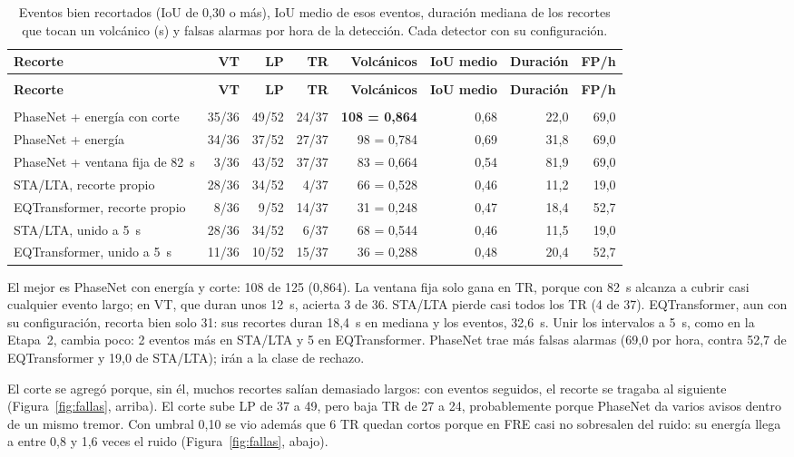 \documentclass[11pt,a4paper,oneside,spanish,oldfontcommands]{memoir}
\newcommand{\cabecera}[2]{%
  \toprule #1 \\ \midrule \endfirsthead
  \multicolumn{#2}{l}{\itshape Cuadro \thetable{} (continuación)}\\
  \toprule #1 \\ \midrule \endhead
  \midrule \multicolumn{#2}{r}{\itshape Continúa en la página siguiente}\\ \endfoot
  \bottomrule \endlastfoot}
\begin{document}
{\small
\setlength{\tabcolsep}{4pt}
\begin{longtable}{>{\raggedright\arraybackslash}p{4.4cm}rrrrrrr}
\caption{Eventos bien recortados (IoU de 0,30 o más), IoU medio de esos eventos, duración mediana de los recortes que tocan un volcánico (s) y falsas alarmas por hora de la detección. Cada detector con su configuración.}\label{tab:recortes}\\
\cabecera{\textbf{Recorte} & \textbf{VT} & \textbf{LP} & \textbf{TR} & \textbf{Volcánicos} & \textbf{IoU medio} & \textbf{Duración} & \textbf{FP/h}}{8}
PhaseNet + energía con corte & 35/36 & 49/52 & 24/37 & \textbf{108 = 0,864} & 0,68 & 22,0 & 69,0 \\
PhaseNet + energía & 34/36 & 37/52 & 27/37 & 98 = 0,784 & 0,69 & 31,8 & 69,0 \\
PhaseNet + ventana fija de 82~s & 3/36 & 43/52 & 37/37 & 83 = 0,664 & 0,54 & 81,9 & 69,0 \\
STA/LTA, recorte propio & 28/36 & 34/52 & 4/37 & 66 = 0,528 & 0,46 & 11,2 & 19,0 \\
EQTransformer, recorte propio & 8/36 & 9/52 & 14/37 & 31 = 0,248 & 0,47 & 18,4 & 52,7 \\
\midrule
STA/LTA, unido a 5~s & 28/36 & 34/52 & 6/37 & 68 = 0,544 & 0,46 & 11,5 & 19,0 \\
EQTransformer, unido a 5~s & 11/36 & 10/52 & 15/37 & 36 = 0,288 & 0,48 & 20,4 & 52,7 \\
\end{longtable}
}

El mejor es PhaseNet con energía y corte: 108 de 125 (0,864). La ventana fija
solo gana en TR, porque con 82~s alcanza a cubrir casi cualquier evento largo;
en VT, que duran unos 12~s, acierta 3 de 36. STA/LTA pierde casi todos los TR (4
de 37). EQTransformer, aun con su configuración, recorta bien solo 31: sus
recortes duran 18,4~s en mediana y los eventos, 32,6~s. Unir los intervalos a
5~s, como en la Etapa~2, cambia poco: 2 eventos más en STA/LTA y 5 en
EQTransformer. PhaseNet trae más falsas alarmas (69,0 por hora, contra 52,7 de
EQTransformer y 19,0 de STA/LTA); irán a la clase de rechazo.

El corte se agregó porque, sin él, muchos recortes salían demasiado largos:
con eventos seguidos, el recorte se tragaba al siguiente
(Figura~\ref{fig:fallas}, arriba). El corte sube LP de 37 a 49, pero baja TR de
27 a 24, probablemente porque PhaseNet da varios avisos dentro de un mismo
tremor. Con umbral 0,10 se vio además que 6 TR quedan cortos porque en FRE casi
no sobresalen del ruido: su energía llega a entre 0,8 y 1,6 veces el ruido
(Figura~\ref{fig:fallas}, abajo).
\end{document}
